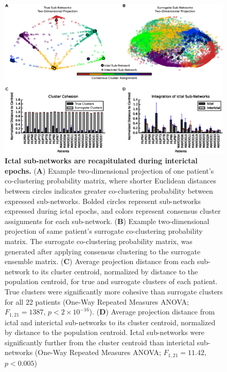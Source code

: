 \begin{figure}[H]
    \centering
    \includegraphics[width=\textwidth]{panel3.eps}
    \caption[Ictal sub-networks recapitulated during interictal epochs]{\textbf{Ictal sub-networks are recapitulated during interictal epochs.} (\textbf{A}) Example two-dimensional projection of one patient's co-clustering probability matrix, where shorter Euclidean distances between circles indicates greater co-clustering probability between expressed sub-networks. Bolded circles represent sub-networks expressed during ictal epochs, and colors represent consensus cluster assignments for each sub-network. (\textbf{B}) Example two-dimensional projection of same patient's surrogate co-clustering probability matrix. The surrogate co-clustering probability matrix, was generated after applying consensus clustering to the surrogate ensemble matrix. (\textbf{C}) Average projection distance from each sub-network to its cluster centroid, normalized by distance to the population centroid, for true and surrogate clusters of each patient. True clusters were significantly more cohesive than surrogate clusters for all 22 patients (One-Way Repeated Measures ANOVA; $F_{1,21}=1387$, $p<2\times10^{-16}$).  (\textbf{D}) Average projection distance from ictal and interictal sub-networks to its cluster centroid, normalized by distance to the population centroid. Ictal sub-networks were significantly further from the cluster centroid than interictal sub-networks (One-Way Repeated Measures ANOVA; $F_{1,21}=11.42$, $p<0.005$) \label{ch4:fig3}}
\end{figure}

